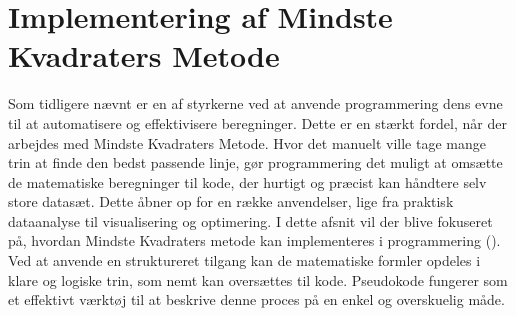 \section{Implementering af Mindste Kvadraters Metode}
Som tidligere nævnt er en af styrkerne ved at anvende programmering dens evne til at automatisere og effektivisere beregninger. Dette er en stærkt fordel, når der arbejdes med Mindste Kvadraters Metode. Hvor det manuelt ville tage mange trin at finde den bedst passende linje, gør programmering det muligt at omsætte de matematiske beregninger til kode, der hurtigt og præcist kan håndtere selv store datasæt. Dette åbner op for en række anvendelser, lige fra praktisk dataanalyse til visualisering og optimering. I dette afsnit vil der blive fokuseret på, hvordan Mindste Kvadraters metode kan implementeres i programmering (\cite{geeksforgeeks2}). Ved at anvende en struktureret tilgang kan de matematiske formler opdeles i klare og logiske trin, som nemt kan oversættes til kode. Pseudokode fungerer som et effektivt værktøj til at beskrive denne proces på en enkel og overskuelig måde.

